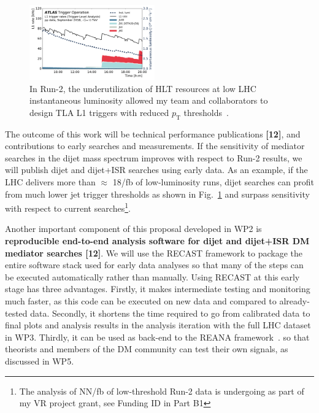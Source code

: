 \begin{figure} 
\begin{center}
\includegraphics[width=0.48\textwidth]{figs_B2/TLAPublicWinter2019_L1Lumi.pdf}
\caption{\color{black}\label{fig:triggerLowThreshold} \small In Run-2, the underutilization of HLT resources at low LHC instantaneous luminosity allowed my team and collaborators to design TLA L1 triggers with reduced $p_\mathrm{T}$ thresholds~\cite{ToBeCited}.} %
\vskip2pt
\end{center}
\end{figure}

The outcome of this work will be technical performance publications \textbf{[12]}, and contributions to early searches and measurements. 
If the sensitivity of mediator searches in the dijet mass spectrum improves with respect to Run-2 results, we will publish dijet and dijet+ISR searches using early data.
As an example, if the LHC delivers more than $\approx$ 18/fb of low-luminosity runs, dijet searches can profit from much lower jet trigger thresholds as shown in Fig.~\ref{fig:triggerLowThreshold} and surpass sensitivity with respect to current searches\footnote{The analysis of NN/fb of low-threshold Run-2 data is undergoing as part of my VR project grant, see Funding ID in Part B1}. 

Another important component of this proposal developed in WP2 is \textbf{reproducible end-to-end analysis software for dijet and dijet+ISR DM mediator searches [12]}. 
We will use the RECAST framework to package the entire software stack used for early data analyses so that many of the steps can be executed automatically rather than manually.
Using RECAST at this early stage has three advantages. 
Firstly, it makes intermediate testing and monitoring much faster, as this code can be executed on new data and compared to already-tested data. 
Secondly, it shortens the time required to go from calibrated data to final plots and analysis results in the analysis iteration with the full LHC dataset in WP3.
Thirdly, it can be used as back-end to the REANA framework~\cite{ToBeCited}. %
so that theorists and members of the DM community can test their own signals, as discussed in WP5.  

